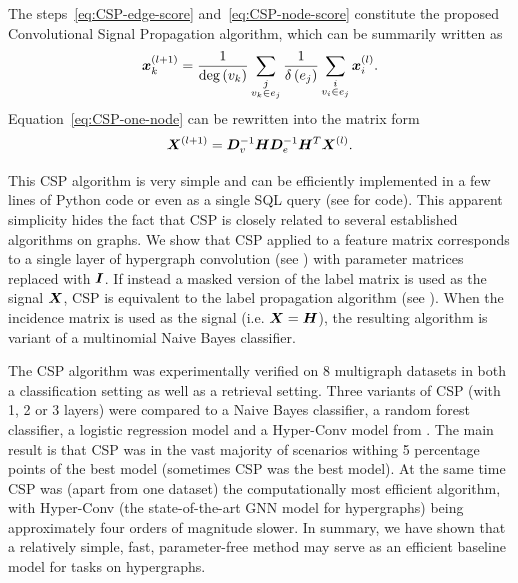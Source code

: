 The steps~\ref{eq:CSP-edge-score} and~\ref{eq:CSP-node-score} constitute the proposed Convolutional Signal Propagation algorithm, which can be summarily written as
\begin{equation}\label{eq:CSP-one-node}
    \bm{x}_k^{(l+1)} = \frac{1}{\mathrm{deg} \left( v_k \right)}\sum_{\substack{j \\ v_k \in e_j}} \frac{1}{\delta \left( e_j \right)}\sum_{\substack{i \\ v_i \in e_j}} \bm{x}_i^{(l)}.
\end{equation}
Equation~\ref{eq:CSP-one-node} can be rewritten into the matrix form
\begin{equation}
    \bm{X}^{(l+1)} = \bm{D}_v^{-1} \bm{H} \bm{D}_e^{-1} \bm{H}^T \bm{X}^{(l)}.
\end{equation}

This CSP algorithm is very simple and can be efficiently implemented in a few lines of Python code or even as a single SQL query (see \cite{prochazka_convolutional_2024} for code). This apparent simplicity hides the fact that CSP is closely related to several established algorithms on graphs. We show that CSP applied to a feature matrix corresponds to a single layer of hypergraph convolution (see \cite{bai_hypergraph_2021}) with parameter matrices replaced with \( \bm{I} \). If instead a masked version of the label matrix is used as the signal \( \bm{X} \), CSP is equivalent to the label propagation algorithm (see \cite{zhu_learning_2003}). When the incidence matrix is used as the signal (i.e. \( \bm{X} = \bm{H} \)), the resulting algorithm is variant of a multinomial Naive Bayes classifier.

The CSP algorithm was experimentally verified on 8 multigraph datasets in both a classification setting as well as a retrieval setting. Three variants of CSP (with 1, 2 or 3 layers) were compared to a Naive Bayes classifier, a random forest classifier, a logistic regression model and a Hyper-Conv model from \cite{bai_hypergraph_2021}. The main result is that CSP was in the vast majority of scenarios withing 5 percentage points of the best model (sometimes CSP was the best model). At the same time CSP was (apart from one dataset) the computationally most efficient algorithm, with Hyper-Conv (the state-of-the-art GNN model for hypergraphs) being approximately four orders of magnitude slower. In summary, we have shown that a relatively simple, fast, parameter-free method may serve as an efficient baseline model for tasks on hypergraphs.
